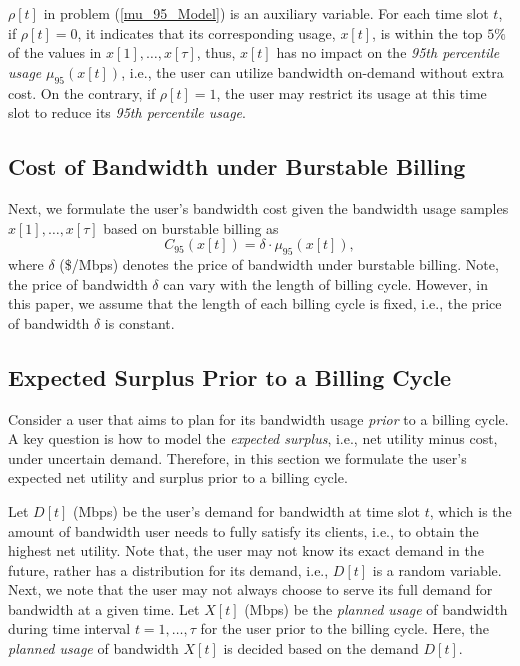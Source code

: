 \documentclass[10pt,journal,compsoc]{IEEEtran}
\begin{document}
  $\rho[t]$ in problem (\ref{mu_95_Model}) is an auxiliary  variable. For each time slot $t$, if $\rho[t]=0$, it indicates that its corresponding usage, $x[t]$, is within the top $5\%$ of the values in $x[1],\ldots,x[\tau]$, thus, $x[t]$ has no impact on the \emph{95th percentile usage} $\mu_{95}(x[t])$, i.e.,  the user can  utilize bandwidth on-demand without extra cost. On the contrary, if $\rho[t]=1$, the user may restrict its usage at this time slot to reduce its \emph{95th percentile usage}. 


\subsection{Cost of Bandwidth under Burstable Billing}\label{subsec:problemformulation}


Next, we formulate the user's bandwidth cost given the bandwidth usage samples $x[1],\ldots,x[\tau]$ based on burstable billing as
\begin{equation}
\label{C_95_Model}
C_{95}(x[t])= \delta \cdot \mu_{95}(x[t]),
\end{equation}
where $\delta$ (\$/Mbps) denotes the price of bandwidth under burstable billing. 
Note, the price of bandwidth $\delta$ can vary with the length of billing cycle. However, in this paper, we assume that the length of each billing cycle is fixed, i.e., the price of bandwidth $\delta$ is constant.




\subsection{Expected Surplus Prior to a Billing Cycle}\label{subsec:netutility}

Consider a user that aims to plan for its bandwidth usage \emph{prior} to a billing cycle. A key question is how to model the \emph{expected surplus}, i.e., net utility minus cost,  under uncertain demand.
Therefore, in this section we formulate  the user's expected net utility and surplus prior to a billing cycle. 

Let $D[t]$ (Mbps) be the user's demand for bandwidth at time slot $t$, which is the amount of bandwidth user needs  to fully satisfy its clients, i.e.,   to obtain the highest net utility. Note that, the user may not know its exact   demand in the future, rather  has a distribution for its demand, i.e.,   $D[t]$ is a  random variable.
Next, we note that  the user may not always choose to serve its full demand for bandwidth at a given time. 
Let $X[t]$ (Mbps) be the \emph{planned usage} of bandwidth  during time interval $t = 1, \ldots, \tau$ for the user prior to the billing cycle.
 Here, the \emph{planned usage} of bandwidth $X[t]$ is decided based on the demand $D[t]$.
\end{document}

